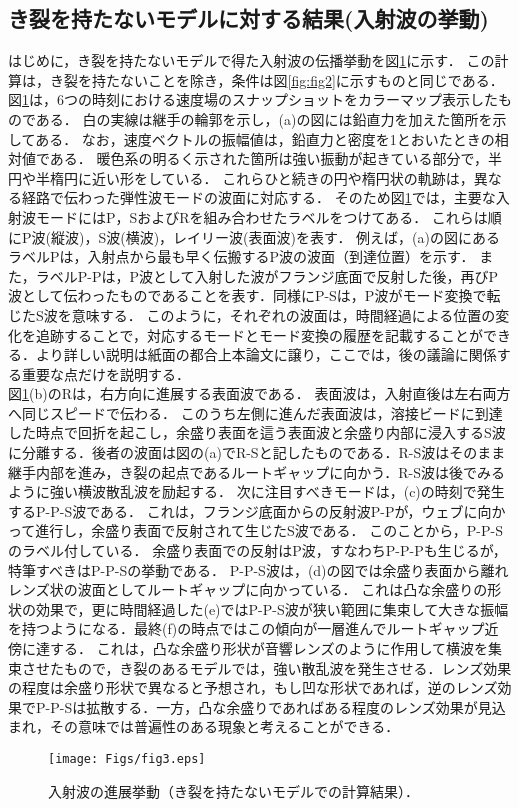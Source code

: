 \documentclass{jsce}
\begin{document}
\subsection{き裂を持たないモデルに対する結果(入射波の挙動)}
はじめに，き裂を持たないモデルで得た入射波の伝播挙動を図\ref{fig:fig3}に示す．
この計算は，き裂を持たないことを除き，条件は図\ref{fig:fig2}に示すものと同じである．
図\ref{fig:fig3}は，6つの時刻における速度場のスナップショットをカラーマップ表示したものである．
白の実線は継手の輪郭を示し，(a)の図には鉛直力を加えた箇所を示してある．
なお，速度ベクトルの振幅値は，鉛直力と密度を1とおいたときの相対値である．
暖色系の明るく示された箇所は強い振動が起きている部分で，半円や半楕円に近い形をしている．
これらひと続きの円や楕円状の軌跡は，異なる経路で伝わった弾性波モードの波面に対応する．
そのため図\ref{fig:fig3}では，主要な入射波モードにはP，SおよびRを組み合わせたラベルをつけてある．
これらは順にP波(縦波)，S波(横波)，レイリー波(表面波)を表す．
例えば，(a)の図にあるラベルPは，入射点から最も早く伝搬するP波の波面（到達位置）を示す．
また，ラベルP-Pは，P波として入射した波がフランジ底面で反射した後，再びP波として伝わったものであることを表す．同様にP-Sは，P波がモード変換で転じたS波を意味する．
このように，それぞれの波面は，時間経過による位置の変化を追跡することで，対応するモードとモード変換の履歴を記載することができる．より詳しい説明は紙面の都合上本論文に譲り，ここでは，後の議論に関係する重要な点だけを説明する．\\
図\ref{fig:fig3}(b)のRは，右方向に進展する表面波である．
表面波は，入射直後は左右両方へ同じスピードで伝わる．
このうち左側に進んだ表面波は，溶接ビードに到達した時点で回折を起こし，余盛り表面を這う表面波と余盛り内部に浸入するS波に分離する．後者の波面は図の(a)でR-Sと記したものである．R-S波はそのまま継手内部を進み，き裂の起点であるルートギャップに向かう．R-S波は後でみるように強い横波散乱波を励起する．
次に注目すべきモードは，(c)の時刻で発生するP-P-S波である．
これは，フランジ底面からの反射波P-Pが，ウェブに向かって進行し，余盛り表面で反射されて生じたS波である．
このことから，P-P-Sのラベル付している．
余盛り表面での反射はP波，すなわちP-P-Pも生じるが，特筆すべきはP-P-Sの挙動である．
P-P-S波は，(d)の図では余盛り表面から離れレンズ状の波面としてルートギャップに向かっている．
これは凸な余盛りの形状の効果で，更に時間経過した(e)ではP-P-S波が狭い範囲に集束して大きな振幅を持つようになる．最終(f)の時点ではこの傾向が一層進んでルートギャップ近傍に達する．
これは，凸な余盛り形状が音響レンズのように作用して横波を集束させたもので，き裂のあるモデルでは，強い散乱波を発生させる．レンズ効果の程度は余盛り形状で異なると予想され，もし凹な形状であれば，逆のレンズ効果でP-P-Sは拡散する．一方，凸な余盛りであればある程度のレンズ効果が見込まれ，その意味では普遍性のある現象と考えることができる．
\begin{figure}[h]
	\begin{center}
	\texttt{[image: Figs/fig3.eps]} 
	\end{center}
	\caption{
		入射波の進展挙動（き裂を持たないモデルでの計算結果）．
	} 
	\label{fig:fig3}
\end{figure}
\end{document}
